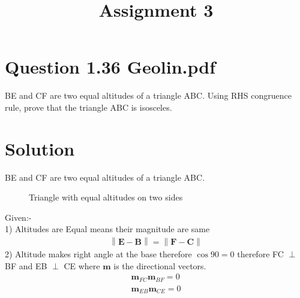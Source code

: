 \documentclass[journal,12pt,twocolumn]{IEEEtran}
\let\vec\mathbf
\newcommand{\norm}[1]{\left\lVert#1\right\rVert}
\begin{document}
\title{Assignment 3}

\author{}
\maketitle
\section{Question 1.36 Geolin.pdf }
BE and CF are two equal altitudes of a triangle ABC. Using RHS congruence rule, prove that the triangle ABC is isosceles.
\section{Solution}

BE and CF are two equal altitudes of a triangle ABC.
\captionsetup{justification=centering}

\begin{figure}[!h]
\centering
\resizebox{.5\columnwidth}{!}
{
}
\caption{Triangle with equal altitudes on two sides}
\label{myfig}
\end{figure}
Given:-\\
1) Altitudes are Equal means their magnitude are same
 \begin{align}
 	\norm{\vec{E - B}} = \norm{\vec{F - C}} \label{1}
 \end{align}
2) Altitude makes right angle at the base therefore $\cos 90 =0$ therefore  FC $\perp$ BF and EB $\perp$ CE where $\textbf{m}$ is the directional vectors.
\begin{align}
\textbf{m}_{FC} \textbf{m}_{BF} = 0 \label{2}\\
\textbf{m}_{EB} \textbf{m}_{CE} = 0 \label{3}
\end{align}
\end{document}
